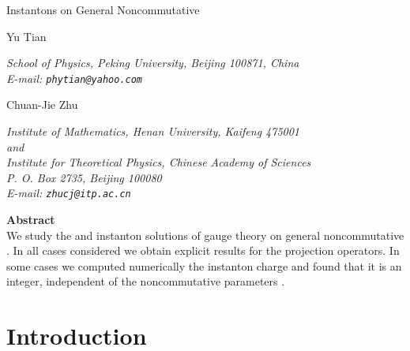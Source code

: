 \documentclass[a4paper,a4paper]{article}
\begin{document}
\providecommand{\half}{\frac{1}{2}}

\thispagestyle{empty}

\begin{center}
 {\Large
    Instantons on General Noncommutative \coordHE{}
 }
\end{center}

\vspace*{2cm}
\begin{center}
 \noindent
 {\large Yu Tian}
 \vspace{5mm}
 \noindent
 \hspace{0.7cm} \parbox{142mm}{\it
School of Physics, Peking University, Beijing 100871, China
\\
E-mail: {\tt phytian@yahoo.com}
 }
\end{center}
 \vspace{5mm}
\begin{center}
 \noindent
 {\large Chuan-Jie Zhu}
 \vspace{5mm}
 \noindent
 \hspace{0.7cm} \parbox{142mm}{\it
Institute of Mathematics, Henan University, Kaifeng 475001
\\
and
\\
Institute for Theoretical Physics, Chinese Academy of Sciences
\\
P. O. Box 2735, Beijing 100080
\\
E-mail: {\tt zhucj@itp.ac.cn}
 }
\end{center}

\vspace{2cm}
\hfill{\bf Abstract\ \ }\hfill\ \\

We study the \coordHE{} and \coordHE{} instanton solutions of gauge theory
on general noncommutative \coordHE{}. In all  cases considered we
obtain explicit results for the projection operators. In some
cases we computed numerically the instanton charge and found that
it is an integer, independent of the noncommutative parameters
\coordHE{}.

\newpage

\section{Introduction}
\end{document}
